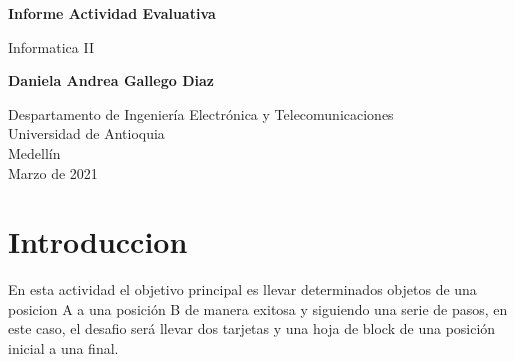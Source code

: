 \documentclass{article}
\begin{document}
\begin{titlepage}
    \begin{center}
        \vspace*{1cm}
            
        \Huge
        \textbf{Informe Actividad Evaluativa}
            
        \vspace{0.5cm}
        \LARGE
        Informatica II
            
        \vspace{1.5cm}
            
        \textbf{Daniela Andrea Gallego Diaz}
            
        \vfill
            
        \vspace{0.8cm}
            
        \Large
        Despartamento de Ingeniería Electrónica y Telecomunicaciones\\
        Universidad de Antioquia\\
        Medellín\\
        Marzo de 2021
            
    \end{center}
\end{titlepage}

\tableofcontents
\newpage
\section{Introduccion}\label{intro}
En esta actividad el objetivo principal es llevar determinados objetos de una posicion A a una posición B de manera exitosa y siguiendo una serie de pasos, en este caso, el desafio será llevar dos tarjetas y una hoja de block de una posición inicial a una final. 
\end{document}
